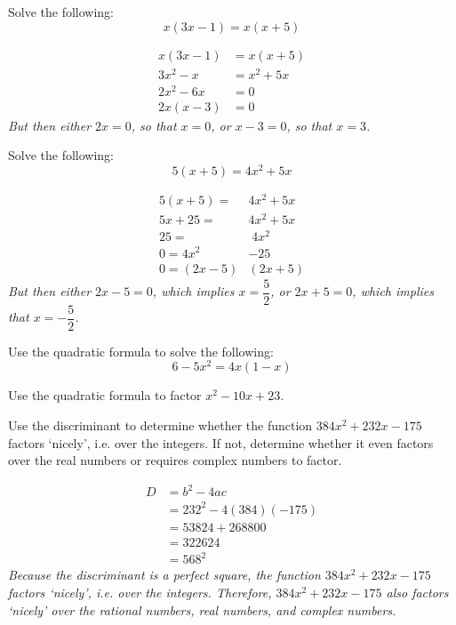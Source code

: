 \documentclass[12pt,letterpaper]{exam}
\begin{document}
\begin{questions}
\newpage
\question[10] Solve the following:
	\[
	x(3x - 1)= x(x + 5)
	\] \pspace

{\itshape
	\[
	\begin{aligned}
	x(3x - 1)&= x(x + 5) \\[0.3cm]
	3x^2 - x&= x^2 + 5x \\[0.3cm]
	2x^2 - 6x&= 0 \\[0.3cm]
	2x(x - 3)&= 0
	\end{aligned}
	\] \pspace
But then either $2x= 0$, so that $x= 0$, or $x - 3=0$, so that $x= 3$. 
}



\newpage
\question[10] Solve the following:
	\[
	5(x + 5)= 4x^2 + 5x
	\] \pspace

{\itshape
	\[
	\begin{aligned}
	5(x + 5)=& 4x^2 + 5x \\[0.3cm]
	5x + 25=& 4x^2 + 5x \\[0.3cm]
	25= & \;4x^2 \\[0.3cm]
	0= 4x^2 &- 25 \\[0.3cm]
	0= (2x - 5)&(2x + 5)
	\end{aligned}
	\] \pspace
But then either $2x - 5= 0$, which implies $x= \dfrac{5}{2}$, or $2x + 5= 0$, which implies that $x= -\dfrac{5}{2}$.}



\newpage
\question[10] Use the quadratic formula to solve the following:
	\[
	6 - 5x^2= 4x(1 - x)
	\]



\newpage
\question[10] Use the quadratic formula to factor $x^2 - 10x + 23$. 



\newpage
\question[10] Use the discriminant to determine whether the function $384x^2 + 232x - 175$ factors `nicely', i.e. over the integers. If not, determine whether it even factors over the real numbers or requires complex numbers to factor. \pspace

{\itshape
	\[
	\begin{aligned}
	D&= b^2 - 4ac \\[0.3cm]
	&= 232^2 - 4(384)(-175) \\[0.3cm]
	&= 53824 + 268800 \\[0.3cm]
	&= 322624 \\[0.3cm]
	&= 568^2
	\end{aligned}
	\] \pspace
Because the discriminant is a perfect square, the function $384x^2 + 232x - 175$ factors `nicely', i.e. over the integers. Therefore, $384x^2 + 232x - 175$ also factors `nicely' over the rational numbers, real numbers, and complex numbers. 
}




\end{questions}
\end{document}
